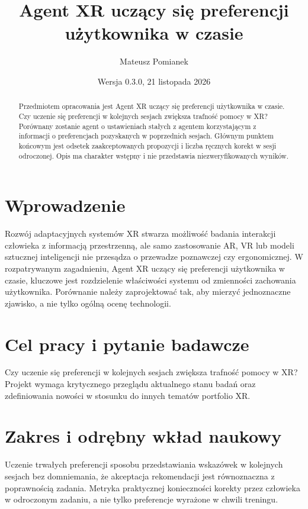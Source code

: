 \documentclass[11pt,a4paper]{article}
\title{Agent XR uczący się preferencji użytkownika w czasie}
\author{Mateusz Pomianek}
\date{Wersja 0.3.0, 21 listopada 2026}
\begin{document}
\maketitle

\begin{abstract}

Przedmiotem opracowania jest Agent XR uczący się preferencji użytkownika w czasie. Czy uczenie się preferencji w kolejnych sesjach zwiększa trafność pomocy w XR? Porównany zostanie agent o ustawieniach stałych z agentem korzystającym z informacji o preferencjach pozyskanych w poprzednich sesjach. Głównym punktem końcowym jest odsetek zaakceptowanych propozycji i liczba ręcznych korekt w sesji odroczonej. Opis ma charakter wstępny i nie przedstawia niezweryfikowanych wyników.

\end{abstract}

\section{Wprowadzenie}

Rozwój adaptacyjnych systemów XR stwarza możliwość badania interakcji człowieka z informacją przestrzenną, ale samo zastosowanie AR, VR lub modeli sztucznej inteligencji nie przesądza o przewadze poznawczej czy ergonomicznej. W rozpatrywanym zagadnieniu, Agent XR uczący się preferencji użytkownika w czasie, kluczowe jest rozdzielenie właściwości systemu od zmienności zachowania użytkownika. Porównanie należy zaprojektować tak, aby mierzyć jednoznaczne zjawisko, a nie tylko ogólną ocenę technologii.

\section{Cel pracy i pytanie badawcze}

Czy uczenie się preferencji w kolejnych sesjach zwiększa trafność pomocy w XR? Projekt wymaga krytycznego przeglądu aktualnego stanu badań oraz zdefiniowania nowości w stosunku do innych tematów portfolio XR.

\section{Zakres i odrębny wkład naukowy}
Uczenie trwałych preferencji sposobu przedstawiania wskazówek w kolejnych sesjach bez domniemania, że akceptacja rekomendacji jest równoznaczna z poprawnością zadania. Metryka praktycznej konieczności korekty przez człowieka w odroczonym zadaniu, a nie tylko preferencje wyrażone w chwili treningu.
\end{document}
